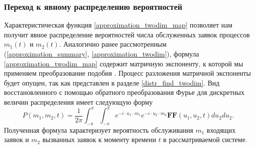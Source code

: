 \subsubsection{Переход к явному распределению вероятностей}
Характеристическая функция \eqref{approximation_twodim_map} позволяет нам получит явное распределение вероятностей числа обслуженных заявок процессов $m_{1}(t)$ и $m_{2}(t)$.
Аналогично ранее рассмотренным (\ref{approximation_summary}, \ref{approximation_twodim}), формула \eqref{approximation_twodim_map} содержит матричную экспоненту, к которой мы применяем преобразование подобия \cite{bronson1991matrix}. Процесс разложения матричной экспоненты будет опущен, так как представлен в разделе \ref{distr_find_twodim}.
Вид восстановленного с помощью обратного преобразования Фурье для дискретных величин распределения имеет следующую форму
\begin{equation}\label{distr_map_twodim}
	P(m_{1},m_{2},t) = \dfrac{1}{2\pi}\int_{-\pi}^{\pi}\int_{-\pi}^{\pi} e^{-i \cdot u_{1} \cdot m_{1}} e^{-i \cdot u_{2} \cdot m_{2}}\boldsymbol{FF}(u_{1},u_{2},t)du_{2}du_{2}.
\end{equation}
Полученная формула характеризует вероятность обслуживания $m_{1}$ входящих заявок и $m_{2}$ вызванных заявок к моменту времени $t$ в рассматриваемой системе.
\clearpage